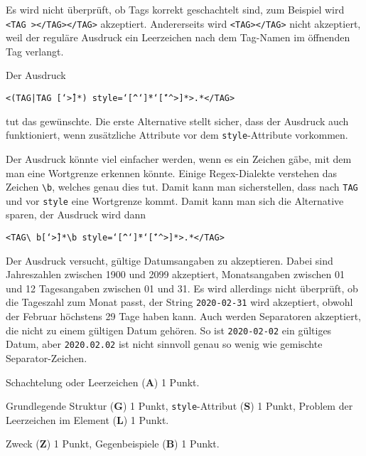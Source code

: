 \begin{loesung}
\begin{teilaufgaben}
\item
Es wird nicht überprüft, ob Tags korrekt geschachtelt sind,
zum Beispiel wird
\texttt{<TAG ></TAG></TAG>}
akzeptiert.
Andererseits wird
\texttt{<TAG></TAG>}
nicht akzeptiert, weil der reguläre Ausdruck ein Leerzeichen nach dem
Tag-Namen im öffnenden Tag verlangt.
\item
Der Ausdruck
\begin{center}
\texttt{<(TAG|TAG [\char`\^>]*) style=\char`\"[\^{}\char`\"]*\char`\"[\char`\^{}>]*>.*</TAG>}
\end{center}
tut das gewünschte.
Die erste Alternative stellt sicher, dass der Ausdruck auch funktioniert,
wenn zusätzliche Attribute vor dem \texttt{style}-Attribute vorkommen.

Der Ausdruck könnte viel einfacher werden, wenn es ein Zeichen gäbe, mit dem
man eine Wortgrenze erkennen könnte.
Einige Regex-Dialekte verstehen das Zeichen \texttt{\textbackslash b}, welches
genau dies tut.
Damit kann man sicherstellen, dass nach \texttt{TAG} und vor \texttt{style}
eine Wortgrenze kommt.
Damit kann man sich die Alternative sparen, der Ausdruck wird dann
\begin{center}
\texttt{<TAG\textbackslash
b[\char`\^>]*\textbackslash b%
style=\char`\"[\^{}\char`\"]*\char`\"[\char`\^{}>]*>.*</TAG>%
}
\end{center}
\item
Der Ausdruck versucht, gültige Datumsangaben zu akzeptieren.
Dabei sind Jahreszahlen zwischen 1900 und 2099 akzeptiert,
Monatsangaben zwischen 01 und 12 Tagesangaben zwischen 01 und 31.
Es wird allerdings nicht überprüft, ob die Tageszahl zum Monat passt,
der String
\texttt{2020-02-31}
wird akzeptiert, obwohl der Februar höchstens
29 Tage haben kann.
Auch werden Separatoren akzeptiert, die nicht zu einem gültigen Datum
gehören.
So ist
\texttt{2020-02-02}
ein gültiges Datum, aber
\texttt{2020.02.02}
ist nicht sinnvoll genau so wenig wie gemischte Separator-Zeichen.
\qedhere
\end{teilaufgaben}
\end{loesung}

\begin{bewertung}
\begin{teilaufgaben}
\item
Schachtelung oder Leerzeichen ({\bf A}) 1 Punkt.
\item
Grundlegende Struktur ({\bf G}) 1 Punkt, 
\texttt{style}-Attribut ({\bf S}) 1 Punkt,
Problem der Leerzeichen im Element ({\bf L}) 1 Punkt.
\item
Zweck ({\bf Z}) 1 Punkt, Gegenbeispiele ({\bf B}) 1 Punkt.
\end{teilaufgaben}
\end{bewertung}
